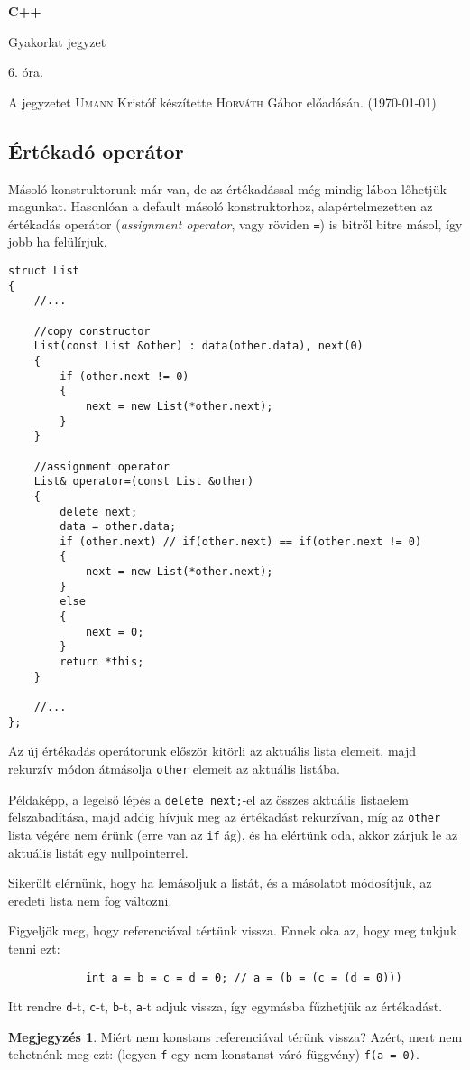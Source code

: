 \documentclass[a4paper,11.5pt,table]{article}
\begin{document}
	\setlength\parindent{0pt}
	\def\<{<\hspace{0mm}<}
	
	\theoremstyle{definition}
	\newtheorem{note}{Megjegyzés}[subsection]
	
	\begin{center}
		{\LARGE\textbf{C++}}
		
		{\Large Gyakorlat jegyzet}
		
		6. óra.
	\end{center}
	A jegyzetet \textsc{Umann} Kristóf készítette \textsc{Horváth} Gábor  előadásán. (\today)
	\subsection{Értékadó operátor}
	Másoló konstruktorunk már van, de az értékadással még mindig lábon lőhetjük magunkat. Hasonlóan a default másoló konstruktorhoz, alapértelmezetten az értékadás operátor (\textit{assignment operator}, vagy röviden \texttt{=}) is bitről bitre másol, így jobb ha felülírjuk.
\begin{lstlisting}
struct List
{
	//...
	
	//copy constructor
	List(const List &other) : data(other.data), next(0)
	{
		if (other.next != 0)
		{
			next = new List(*other.next);
		}
	}
	
	//assignment operator
	List& operator=(const List &other)
	{
		delete next;
		data = other.data;
		if (other.next) // if(other.next) == if(other.next != 0)
		{
			next = new List(*other.next);
		}
		else
		{
			next = 0;
		}
		return *this;
	}
	
	//...
};
\end{lstlisting}
	Az új értékadás operátorunk először kitörli az aktuális lista elemeit, majd rekurzív módon átmásolja \texttt{other} elemeit az aktuális listába.
	
	Példaképp, a legelső lépés a \texttt{delete next;}-el az összes aktuális listaelem felszabadítása, majd addig hívjuk meg az értékadást rekurzívan, míg az \texttt{other} lista végére nem érünk (erre van az \texttt{if} ág), és ha elértünk oda, akkor zárjuk le az aktuális listát egy nullpointerrel. 
	
	Sikerült elérnünk, hogy ha lemásoljuk a listát, és a másolatot módosítjuk, az eredeti lista nem fog változni.
	\medskip
	
	Figyeljök meg, hogy referenciával tértünk vissza. Ennek oka az, hogy meg tukjuk tenni ezt:
	\begin{lstlisting}
			int a = b = c = d = 0; // a = (b = (c = (d = 0)))
	\end{lstlisting}
	Itt rendre \texttt{d}-t, \texttt{c}-t, \texttt{b}-t, \texttt{a}-t adjuk vissza, így egymásba fűzhetjük az értékadást.
	\begin{note}
		Miért nem konstans referenciával térünk vissza? Azért, mert nem tehetnénk meg ezt: (legyen \texttt{f} egy nem konstanst váró függvény) \texttt{f(a = 0)}.
	\end{note}
	
\end{document}
